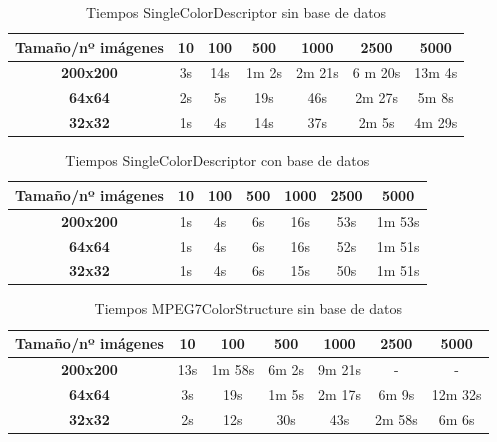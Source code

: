 \begin{table}[H]
\centering
\begin{tabular}{|c|c|c|c|c|c|c|}
\hline
\textbf{Tamaño/nº imágenes} & \textbf{10} & \textbf{100} & \textbf{500} & \textbf{1000} & \textbf{2500} & \textbf{5000} \\ \hline
\textbf{200x200}            & 3s          & 14s          & 1m 2s        & 2m 21s        & 6 m 20s       & 13m 4s        \\ \hline
\textbf{64x64}              & 2s          & 5s           & 19s          & 46s           & 2m 27s        & 5m 8s         \\ \hline
\textbf{32x32}              & 1s          & 4s           & 14s          & 37s           & 2m 5s         & 4m 29s        \\ \hline
\end{tabular}
\label{Tiempos SingleColorDescriptor}
\caption{Tiempos SingleColorDescriptor sin base de datos}
\end{table}

\begin{table}[H]
\centering
\begin{tabular}{|c|c|c|c|c|c|c|}
\hline
\textbf{Tamaño/nº imágenes} & \textbf{10} & \textbf{100} & \textbf{500} & \textbf{1000} & \textbf{2500} & \textbf{5000} \\ \hline
\textbf{200x200}            & 1s          & 4s           & 6s           & 16s           & 53s           & 1m 53s        \\ \hline
\textbf{64x64}              & 1s          & 4s           & 6s           & 16s           & 52s           & 1m 51s        \\ \hline
\textbf{32x32}              & 1s          & 4s           & 6s           & 15s           & 50s           & 1m 51s        \\ \hline
\end{tabular}
\label{Tiempos SingleColorDescriptor}
\caption{Tiempos SingleColorDescriptor con base de datos}
\end{table}

\begin{table}[H]
\centering
\begin{tabular}{|c|c|c|c|c|c|c|}
\hline
\textbf{Tamaño/nº imágenes} & \textbf{10} & \textbf{100} & \textbf{500} & \textbf{1000} & \textbf{2500} & \textbf{5000} \\ \hline
\textbf{200x200}            & 13s         & 1m 58s       & 6m 2s        & 9m 21s        & -             & -             \\ \hline
\textbf{64x64}              & 3s          & 19s          & 1m 5s        & 2m 17s        & 6m 9s         & 12m 32s       \\ \hline
\textbf{32x32}              & 2s          & 12s          & 30s          & 43s           & 2m 58s        & 6m 6s         \\ \hline
\end{tabular}
\caption{Tiempos MPEG7ColorStructure sin base de datos}
\label{my-label}
\end{table}

